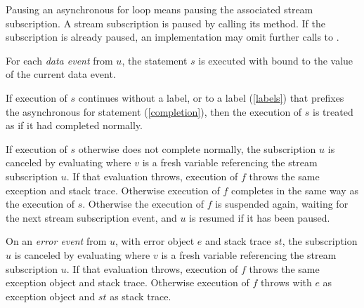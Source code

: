 \documentclass{article}
\begin{document}
Pausing an asynchronous for loop means pausing the associated stream subscription.
A stream subscription is paused by calling its  method.
If the subscription is already paused, an implementation may omit further calls to .


\LMHash{}
For each {\em data event} from $u$,
the statement $s$ is executed with \id{} bound to the value of the current data event.


\LMHash{}
If execution of $s$ continues without a label, or to a label (\ref{labels}) that prefixes the asynchronous for statement (\ref{completion}), then the execution of $s$ is treated as if it had completed normally.

If execution of $s$ otherwise does not complete normally, the subscription $u$ is canceled by evaluating  where $v$ is a fresh variable referencing the stream subscription $u$.
If that evaluation throws,
execution of $f$ throws the same exception and stack trace.
Otherwise execution of $f$ completes in the same way as the execution of $s$.
Otherwise the execution of $f$ is suspended again, waiting for the next stream subscription event, and $u$ is resumed if it has been paused.

\LMHash{}
On an {\em error event} from $u$,
with error object $e$ and stack trace $st$,
the subscription $u$ is canceled by evaluating 
where $v$ is a fresh variable referencing the stream subscription $u$.
If that evaluation throws,
execution of $f$ throws the same exception object and stack trace.
Otherwise execution of $f$ throws with $e$ as exception object and $st$ as stack trace.
\end{document}
